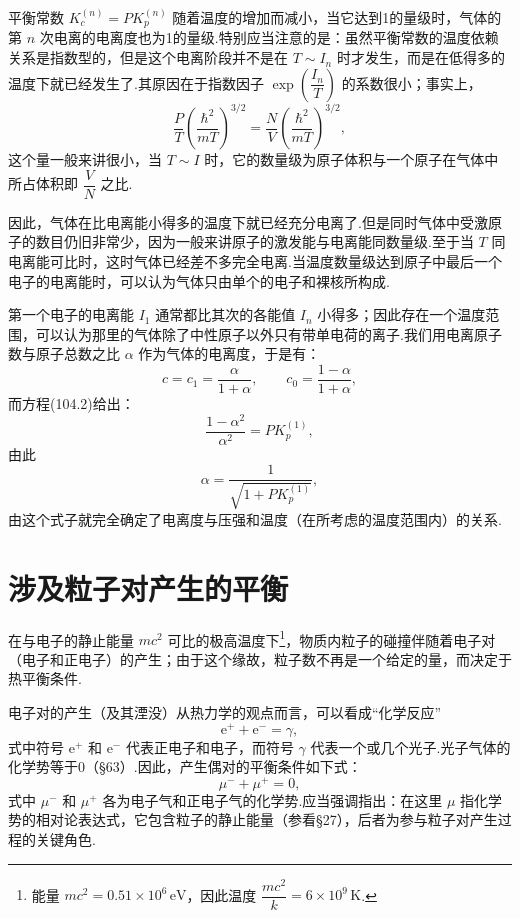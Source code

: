 平衡常数 $K_c^{(n)}=PK_p^{(n)}$ 随着温度的增加而减小，当它达到1的量级时，气体的第 $n$ 次电离的电离度也为1的量级.特别应当注意的是：虽然平衡常数的温度依赖关系是指数型的，但是这个电离阶段并不是在 $T\sim I_n$ 时才发生，而是在低得多的温度下就已经发生了.其原因在于指数因子 $\exp\left(\dfrac{I_n}{T}\right)$ 的系数很小；事实上，
\begin{equation*}
  \frac PT\left(\frac{\hbar^2}{mT}\right)^{3/2}
  =\frac NV\left(\frac{\hbar^2}{mT}\right)^{3/2},
\end{equation*}
这个量一般来讲很小，当 $T\sim I$ 时，它的数量级为原子体积与一个原子在气体中所占体积即 $\dfrac VN$ 之比.

因此，气体在比电离能小得多的温度下就已经充分电离了.但是同时气体中受激原子的数目仍旧非常少，因为一般来讲原子的激发能与电离能同数量级.至于当 $T$ 同电离能可比时，这时气体已经差不多完全电离.当温度数量级达到原子中最后一个电子的电离能时，可以认为气体只由单个的电子和裸核所构成.

第一个电子的电离能 $I_1$ 通常都比其次的各能值 $I_n$ 小得多；因此存在一个温度范围，可以认为那里的气体除了中性原子以外只有带单电荷的离子.我们用电离原子数与原子总数之比 $\alpha$ 作为气体的电离度，于是有：
\begin{equation*}
  c=c_1=\frac{\alpha}{1+\alpha},\qquad
  c_0=\frac{1-\alpha}{1+\alpha},
\end{equation*}
而方程(104.2)给出：
\begin{equation*}
  \frac{1-\alpha^2}{\alpha^2}=PK_p^{(1)},
\end{equation*}
由此
\begin{equation}
  \alpha=\frac{1}{\sqrt{1+PK_p^{(1)}}},
\end{equation}
由这个式子就完全确定了电离度与压强和温度（在所考虑的温度范围内）的关系.

\section{涉及粒子对产生的平衡}

在与电子的静止能量 $mc^2$ 可比的极高温度下\footnote{能量 $mc^{2}=0.51\times10^{6}\,\mathrm{eV}$，因此温度 $\dfrac{mc^{2}}{k}=6\times10^{9}\,\mathrm{K}$.}，物质内粒子的碰撞伴随着电子对（电子和正电子）的产生；由于这个缘故，粒子数不再是一个给定的量，而决定于热平衡条件.

电子对的产生（及其湮没）从热力学的观点而言，可以看成“化学反应”
\begin{equation*}
  \mathrm{e}^++\mathrm{e}^-=\gamma,
\end{equation*}
式中符号 $\mathrm{e}^+$ 和 $\mathrm{e}^-$ 代表正电子和电子，而符号 $\gamma$ 代表一个或几个光子.光子气体的化学势等于0（§63）.因此，产生偶对的平衡条件如下式：
\begin{equation}
  \mu^-+\mu^+=0,
\end{equation}
式中 $\mu^-$ 和 $\mu^+$ 各为电子气和正电子气的化学势.应当强调指出：在这里 $\mu$ 指化学势的相对论表达式，它包含粒子的静止能量（参看§27），后者为参与粒子对产生过程的关键角色.

